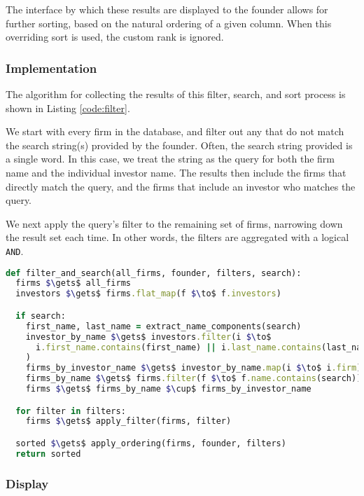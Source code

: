 The interface by which these results are displayed to the founder allows for further sorting, based on the natural ordering of a given column. When this overriding sort is used, the custom rank is ignored.

\subsubsection{Implementation}

The algorithm for collecting the results of this filter, search, and sort process is shown in Listing \ref{code:filter}.

We start with every firm in the database, and filter out any that do not match the search string(s) provided by the founder. Often, the search string provided is a single word. In this case, we treat the string as the query for both the firm name and the individual investor name. The results then include the firms that directly match the query, and the firms that include an investor who matches the query.

We next apply the query's filter to the remaining set of firms, narrowing down the result set each time. In other words, the filters are aggregated with a logical \texttt{AND}.

\begin{lstlisting}[float,frame=single,mathescape=true,language=Ruby,basicstyle=\footnotesize,columns=fullflexible,caption={Filter and Search},label={code:filter}]
def filter_and_search(all_firms, founder, filters, search):
  firms $\gets$ all_firms
  investors $\gets$ firms.flat_map(f $\to$ f.investors)

  if search:
    first_name, last_name = extract_name_components(search)
    investor_by_name $\gets$ investors.filter(i $\to$
      i.first_name.contains(first_name) || i.last_name.contains(last_name)
    )
    firms_by_investor_name $\gets$ investor_by_name.map(i $\to$ i.firm)
    firms_by_name $\gets$ firms.filter(f $\to$ f.name.contains(search))
    firms $\gets$ firms_by_name $\cup$ firms_by_investor_name

  for filter in filters:
    firms $\gets$ apply_filter(firms, filter)

  sorted $\gets$ apply_ordering(firms, founder, filters)
  return sorted
\end{lstlisting}

\subsubsection{Display}

